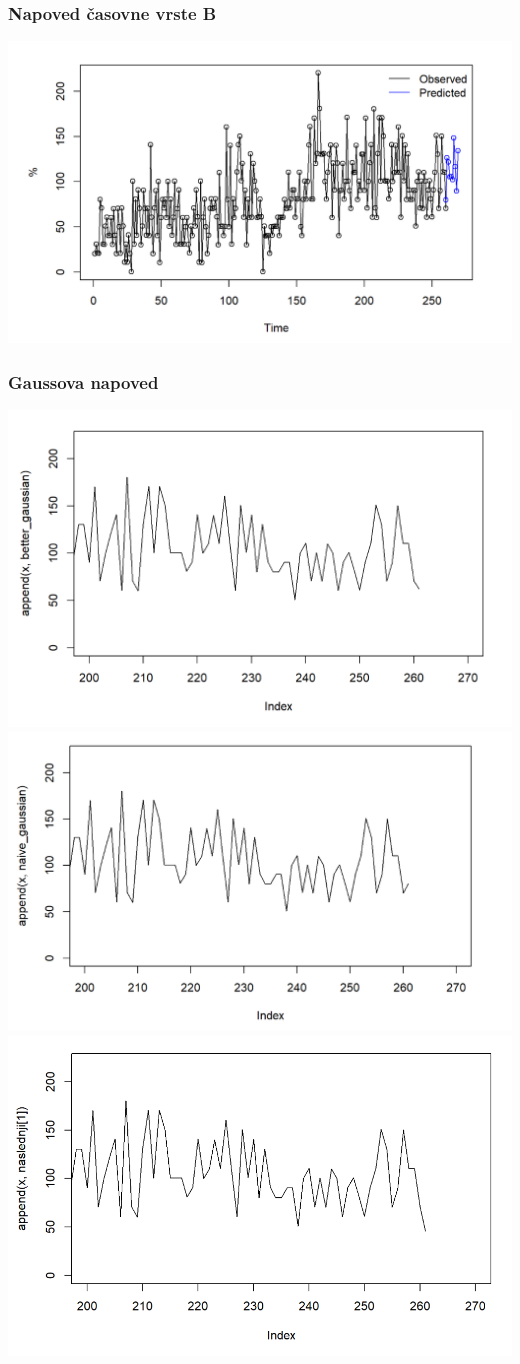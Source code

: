 \documentclass[10pt]{beamer}
\begin{document}
\begin{frame}
\frametitle{Napoved časovne vrste B}
\includegraphics[width=1\textwidth]{napovedB.png}
\end{frame}


\begin{frame}
\frametitle{Gaussova napoved}
\includegraphics[width=1\textwidth]{betterB.png}
\includegraphics[width=1\textwidth]{naiveB.png}
\includegraphics[width=1\textwidth]{naslednjiB.png}
\end{frame}
\end{document}

